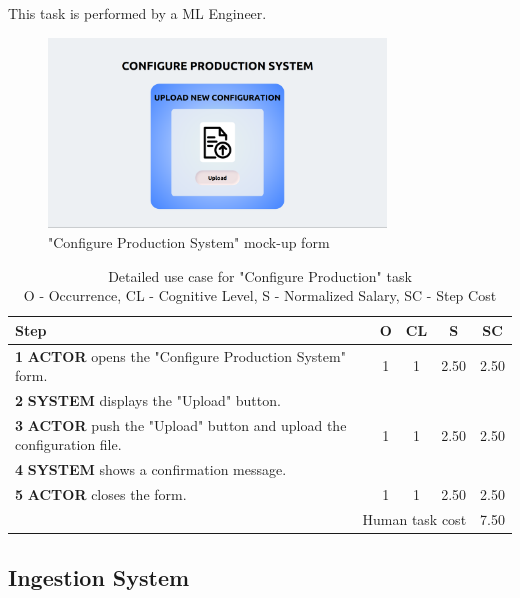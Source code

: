 This task is performed by a ML Engineer.

\begin{figure}[H]
\centering
\includegraphics[width=0.8\textwidth]{figures/ui_configure_production.png}
\caption{"Configure Production System" mock-up form}
\end{figure}

\begin{table}[H]
\centering
\begin{tabularx}{\textwidth}{|X|c|c|c|c|}
\hline
\textbf{Step} & \textbf{O} & \textbf{CL} & \textbf{S} & \textbf{SC} \\
\hline
\textbf{1} \textbf{ACTOR} opens the "Configure Production System" form. & 1 & 1 & 2.50 & 2.50 \\
\hline
\textbf{2} \textbf{SYSTEM} displays the "Upload" button.& & & & \\
\hline
\textbf{3} \textbf{ACTOR} push the "Upload" button and upload the configuration file. & 1 & 1 & 2.50 & 2.50 \\
\hline
\textbf{4} \textbf{SYSTEM} shows a confirmation message. & & & & \\
\hline
\textbf{5} \textbf{ACTOR} closes the form. & 1 & 1 & 2.50 & 2.50 \\
\hline
\multicolumn{4}{|r|}{Human task cost} & 7.50 \\
\hline
\end{tabularx}
\caption{Detailed use case for "Configure Production" task\\ 
O - Occurrence, CL - Cognitive Level, S - Normalized Salary, SC - Step Cost}
\label{table:configure_production_system}
\end{table}



\subsection{Ingestion System}

